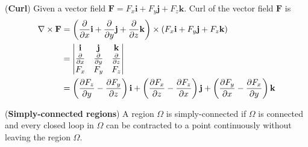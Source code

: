 \documentclass{huhtakm-template-book}
\begin{document}
\begin{defn}(\textbf{Curl})
    Given a vector field $\mathbf{F}=F_{x}\mathbf{i}+F_{y}\mathbf{j}+F_{z}\mathbf{k}$. Curl of the vector field $\mathbf{F}$ is
    \begin{align*}
        \nabla\times\mathbf{F}&=\left(\pdv*{}{x}\mathbf{i}+\pdv*{}{y}\mathbf{j}+\pdv*{}{z}\mathbf{k}\right)\times(F_{x}\mathbf{i}+F_{y}\mathbf{j}+F_{z}\mathbf{k})\\
        &=\begin{vmatrix}
            \mathbf{i} & \mathbf{j} & \mathbf{k}\\
            \pdv*{}{x} & \pdv*{}{y} & \pdv*{}{z}\\
            F_{x} & F_{y} & F_{z}
        \end{vmatrix}\\
        &=\left(\pdv{F_{z}}{y}-\pdv{F_{y}}{z}\right)\mathbf{i}+\left(\pdv{F_{x}}{z}-\pdv{F_{z}}{x}\right)\mathbf{j}+\left(\pdv{F_{y}}{x}-\pdv{F_{x}}{y}\right)\mathbf{k}
    \end{align*}
\end{defn}
\begin{defn}(\textbf{Simply-connected regions})
    A region $\Omega$ is simply-connected if $\Omega$ is connected and every closed loop in $\Omega$ can be contracted to a point continuously without leaving the region $\Omega$.
\end{defn}
\end{document}
